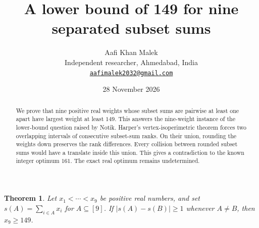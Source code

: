 \documentclass[11pt,letterpaper]{article}
\title{A lower bound of 149 for nine separated subset sums}
\author{Aafi Khan Malek\\ \small Independent researcher, Ahmedabad, India\\
\small\href{mailto:aafimalek2032@gmail.com}{\texttt{aafimalek2032@gmail.com}}}
\date{28 November 2026}
\newtheorem{theorem}{Theorem}
\begin{document}
\maketitle
\begin{abstract}
We prove that nine positive real weights whose subset sums are pairwise at
least one apart have largest weight at least $149$. This answers the
nine-weight instance of the lower-bound question raised by Notik. Harper's
vertex-isoperimetric theorem forces two overlapping intervals of consecutive
subset-sum ranks. On their union, rounding the weights down preserves the
rank differences. Every collision between rounded subset sums would have
a translate inside this union. This gives a contradiction to the known
integer optimum $161$. The exact real optimum remains undetermined.
\end{abstract}

\begin{theorem}
Let $x_1<\cdots<x_9$ be positive real numbers, and set
$s(A)=\sum_{i\in A}x_i$ for $A\subseteq[9]$. If
$|s(A)-s(B)|\ge1$ whenever $A\ne B$, then $x_9\ge149$.
\end{theorem}
\end{document}
